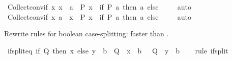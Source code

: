 \begin{isabellebody}
\isamarkupfalse%
\ Collect{\isacharunderscore}{\kern0pt}conv{\isacharunderscore}{\kern0pt}if{\isacharcolon}{\kern0pt}\ {\isachardoublequoteopen}{\isacharbraceleft}{\kern0pt}x{\isachardot}{\kern0pt}\ x\ {\isacharequal}{\kern0pt}\ a\ {\isasymand}\ P\ x{\isacharbraceright}{\kern0pt}\ {\isacharequal}{\kern0pt}\ {\isacharparenleft}{\kern0pt}if\ P\ a\ then\ {\isacharbraceleft}{\kern0pt}a{\isacharbraceright}{\kern0pt}\ else\ {\isacharbraceleft}{\kern0pt}{\isacharbraceright}{\kern0pt}{\isacharparenright}{\kern0pt}{\isachardoublequoteclose}\isanewline
%
\isadelimproof
\ \ %
\endisadelimproof
%
\isatagproof
{}\isamarkupfalse%
\ auto%
\endisatagproof
{\isafoldproof}%
%
\isadelimproof
\isanewline
%
\endisadelimproof
\isanewline
{}\isamarkupfalse%
\ Collect{\isacharunderscore}{\kern0pt}conv{\isacharunderscore}{\kern0pt}if{}{\isacharcolon}{\kern0pt}\ {\isachardoublequoteopen}{\isacharbraceleft}{\kern0pt}x{\isachardot}{\kern0pt}\ a\ {\isacharequal}{\kern0pt}\ x\ {\isasymand}\ P\ x{\isacharbraceright}{\kern0pt}\ {\isacharequal}{\kern0pt}\ {\isacharparenleft}{\kern0pt}if\ P\ a\ then\ {\isacharbraceleft}{\kern0pt}a{\isacharbraceright}{\kern0pt}\ else\ {\isacharbraceleft}{\kern0pt}{\isacharbraceright}{\kern0pt}{\isacharparenright}{\kern0pt}{\isachardoublequoteclose}\isanewline
%
\isadelimproof
\ \ %
\endisadelimproof
%
\isatagproof
{}\isamarkupfalse%
\ auto%
\endisatagproof
{\isafoldproof}%
%
\isadelimproof
%
\endisadelimproof
%
\begin{isamarkuptext}%
Rewrite rules for boolean case-splitting: faster than .%
\end{isamarkuptext}\isamarkuptrue%
\isamarkupfalse%
\ if{\isacharunderscore}{\kern0pt}split{\isacharunderscore}{\kern0pt}eq{}{\isacharcolon}{\kern0pt}\ {\isachardoublequoteopen}{\isacharparenleft}{\kern0pt}if\ Q\ then\ x\ else\ y{\isacharparenright}{\kern0pt}\ {\isacharequal}{\kern0pt}\ b\ {\isasymlongleftrightarrow}\ {\isacharparenleft}{\kern0pt}Q\ {\isasymlongrightarrow}\ x\ {\isacharequal}{\kern0pt}\ b{\isacharparenright}{\kern0pt}\ {\isasymand}\ {\isacharparenleft}{\kern0pt}{\isasymnot}\ Q\ {\isasymlongrightarrow}\ y\ {\isacharequal}{\kern0pt}\ b{\isacharparenright}{\kern0pt}{\isachardoublequoteclose}\isanewline
%
\isadelimproof
\ \ %
\endisadelimproof
%
\isatagproof
{}\isamarkupfalse%
\ {\isacharparenleft}{\kern0pt}rule\ if{\isacharunderscore}{\kern0pt}split{\isacharparenright}{\kern0pt}%

\end{isabellebody}
